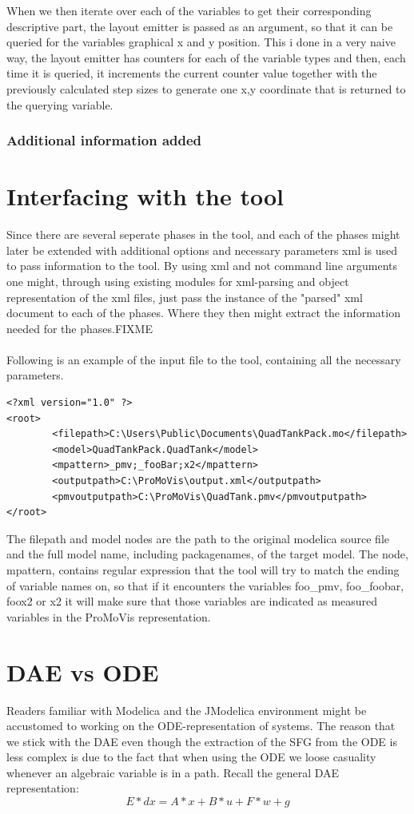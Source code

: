 When we then iterate over each of the variables to get their corresponding descriptive part, the layout emitter is passed as an argument, so that it can be queried for the variables graphical x and y position. This i done in a very naive way, the layout emitter has counters for each of the variable types and then, each time it is queried, it increments the current counter value together with the previously calculated step sizes to generate one x,y coordinate that is returned to the querying variable. 
\subsubsection{Additional information added}

\section{Interfacing with the tool}
Since there are several seperate phases in the tool, and each of the phases might later be extended with additional options and necessary parameters xml is used to pass information to the tool. By using xml and not command line arguments one might, through using existing modules for xml-parsing and object representation of the xml files, just pass the instance of the "parsed" xml document to each of the phases. Where they then might extract the information needed for the phases.FIXME\\\\Following is an example of the input file to the tool, containing all the necessary parameters.
\begin{lstlisting}
<?xml version="1.0" ?> 
<root>
        <filepath>C:\Users\Public\Documents\QuadTankPack.mo</filepath>
        <model>QuadTankPack.QuadTank</model>
        <mpattern>_pmv;_fooBar;x2</mpattern>
        <outputpath>C:\ProMoVis\output.xml</outputpath>
        <pmvoutputpath>C:\ProMoVis\QuadTank.pmv</pmvoutputpath>
</root>
\end{lstlisting}
The filepath and model nodes are the path to the original modelica source file and the full model name, including packagenames, of the target model. The node, mpattern, contains regular expression that the tool will try to match the ending of variable names on, so that if it encounters the variables foo\_pmv, foo\_foobar, foox2 or x2 it will make sure that those variables are indicated as measured variables in the ProMoVis representation.


\section{DAE vs ODE}
Readers familiar with Modelica and the JModelica environment might be accustomed to working on the ODE-representation of systems. The reason that we stick with the DAE even though the extraction of the SFG from the ODE is less complex is due to the fact that when using the ODE we loose casuality whenever an algebraic variable is in a path. Recall the general DAE representation:
\begin{equation}
E*dx = A*x + B*u + F*w + g
\end{equation}

